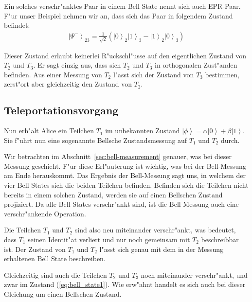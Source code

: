 \begin{refsection}
Ein solches verschr"anktes Paar in einem Bell State nennt sich auch EPR-Paar. F"ur unser Beispiel nehmen wir an, dass sich das Paar in folgendem Zustand befindet:
\begin{align}\label{eq:bell_state1}
\left|\Psi^{-}\right\rangle_{23} = \frac{1}{\sqrt{2}} ( \left|0\right\rangle_{2}\left|1\right\rangle_{3} - \left|1\right\rangle_{2}\left|0\right\rangle_{3} )
\end{align}

Dieser Zustand erlaubt keinerlei R"uckschl"usse auf den eigentlichen Zustand von $T_{2}$ und $T_{3}$. Er sagt einzig aus, dass sich $T_{2}$ und $T_{3}$ in orthogonalen Zust"anden befinden. Aus einer Messung von $T_{2}$ l"asst sich der Zustand von $T_{3}$ bestimmen, zerst"ort aber gleichzeitig den Zustand von $T_{2}$. 

\subsection{Teleportationsvorgang}\label{sec:teleportation}

Nun erh"alt Alice ein Teilchen $T_{1}$ im unbekannten Zustand $\left|\phi\right\rangle = \alpha\left|0\right\rangle + \beta\left|1\right\rangle$. Sie f"uhrt nun eine sogenannte Bellsche Zustandsmessung auf $T_{1}$ und $T_{2}$ durch.

Wir betrachten im Abschnitt~\ref{sec:bell-measurement} genauer, was bei dieser Messung geschieht. F"ur diese Erl"auterung ist wichtig, was bei der Bell-Messung am Ende herauskommt. Das Ergebnis der Bell-Messung sagt uns, in welchem der vier Bell States sich die beiden Teilchen befinden. Befinden sich die Teilchen nicht bereits in einem solchen Zustand, werden sie auf einen Bellschen Zustand projiziert. Da alle Bell States verschr"ankt sind, ist die Bell-Messung auch eine verschr"ankende Operation.

Die Teilchen $T_{1}$ und $T_{2}$ sind also neu miteinander verschr"ankt, was bedeutet, dass $T_{1}$ seinen Identit"at verliert und nur noch gemeinsam mit $T_{2}$ beschreibbar ist. Der Zustand von $T_{1}$ und $T_{2}$ l"asst sich genau mit dem in der Messung erhaltenen Bell State beschreiben. 

Gleichzeitig sind auch die Teilchen $T_{2}$ und $T_{3}$ noch miteinander verschr"ankt, und zwar im Zustand (\ref{eq:bell_state1}). Wie erw"ahnt handelt es sich auch bei dieser Gleichung um einen Bellschen Zustand.


\end{refsection}
